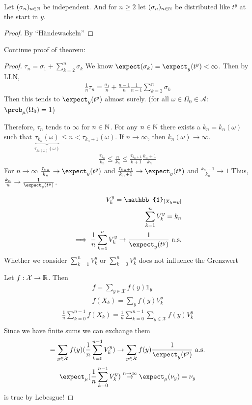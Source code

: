 \documentclass[mfit.tex]{subfiles}
\begin{document}
\begin{lemma}
  Let $(\sigma_n)_{n \in \mathbb{N}}$ be independent. 
  And for $n \geq 2$ let $(\sigma_n)_{n \in \mathbb{N}}$ be distributed like $t^y$ at the start in $y$.
\end{lemma}

\begin{proof}
  By \enquote{Händewackeln}
\end{proof}

Continue proof of theorem:
\begin{proof}
  $\tau_n = \sigma_1 + \sum_{k=2}^n \sigma_k$
  We know $\expect(\sigma_k) = \expect_y(t^y) < \infty$.
  Then by LLN, 
  \begin{align*}
    \frac{1}{n} \tau_n = \frac{\sigma_1}{n} + \frac{n-1}{n} \frac{1}{n-1} \sum_{k=2}^n \sigma_k
  \end{align*}
  Then this tends to $\expect_y(t^y)$ almost surely. (for all $\omega \in \Omega_0 \in \mathcal{A}$: $\prob_\mu(\Omega_0) = 1$)
  
  Therefore, $\tau_n$ tends to $\infty$ for $n \in \mathbb{N}$.
  For any $n \in \mathbb{N}$ there exists a $k_n = k_n(\omega)$ such that $\underbrace{\tau_{k_n}(\omega)}_{\tau_{k_n(\omega)}(\omega)} \leq n < \tau_{k_n + 1} (\omega)$.
  If $n \to \infty$, then $k_n(\omega) \to \infty$.
  \begin{align*}
    \frac{\tau_{k_n}}{k_n} \leq \frac{n}{k_n} \leq \frac{\tau_{k_n+1}}{k+1} \frac{k_n + 1}{k_n}
  \end{align*}
  For $n \to \infty$ $\frac{\tau_{k_n}}{k_n} \to \expect_y(t^y)$ and $\frac{\tau_{k_n+1}}{k_n+1} \to \expect_y(t^y)$ and $\frac{k_n+1}{k_n} \to 1$
  Thus, $\frac{k_n}{n} \to \frac{1}{\expect_y(t^y)}$.
  
  \begin{align*}
    V_k^y = \mathbb{1}_{[X_k = y]} \\
    \sum_{k=1}^n V_k^y = k_n \\
    \implies \frac{1}{n} \sum_{k=1}^n V_k^y \to \frac{1}{\expect_y(t^y)} \text{ a.s.}
  \end{align*}
  Whether we consider $\sum_{k=1}^n V_k^y$ or $\sum_{k=0}^n V_k^y$ does not influence the Grenzwert
  
  Let $f: \mathcal{X} \to \mathbb{R}$. Then
  \begin{align*}
    f = \sum_{y \in \mathcal{X}} f(y) \mathbb{1}_y \\
    f(X_k) = \sum_y f(y) V_k^y
  \end{align*}
  \begin{align*}
    \frac{1}{n} \sum_{k=0}^{n-1} f(X_k) = \frac{1}{n} \sum_{k=0}^{n-1} \sum_{y \in \mathcal{X}} f(y) V_k^y \\
  \end{align*}
  Since we have finite sums we can exchange them
  \begin{align*}
    = \sum_{y \in \mathcal{X}} f(y) ( \frac{1}{n} \sum_{k=0}^{n-1} V_k^y) \to \sum_{y \in \mathcal{X}} f(y) \frac{1}{\expect_y(t^y)} \text{ a.s.}
  \end{align*}
  \begin{align*}
    \expect_\mu (\frac{1}{n} \sum_{k=0}^{n-1} V_k^y) \overset{n \to \infty}{ \to} \expect_\mu(\nu_y) = \nu_y
  \end{align*}
  is true by Lebesgue!
  

\end{proof}
\end{document}
